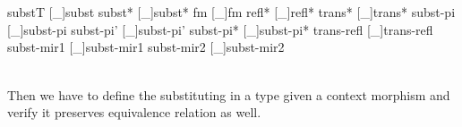 {\begin{code}
\\
\>[2]\<[14]%
\>[14]\AgdaSymbol{\{} \AgdaSymbol{:} \AgdaFunction{[}  \AgdaFunction{]}   \AgdaSymbol{\}\{} \AgdaSymbol{:} \AgdaFunction{[}  \AgdaFunction{]}   \AgdaSymbol{\}}\<%
\\
\>[2]\<[14]%
\>[14]\AgdaSymbol{\{} \AgdaSymbol{:}    \AgdaSymbol{\}\{} \AgdaSymbol{:}    \AgdaSymbol{\}}  \<[45]%
\>[45]\<%
\\
\>[2]\<[14]%
\>[14]\AgdaFunction{[}   \AgdaFunction{]}       \AgdaFunction{[}   \AgdaFunction{]}     \<%
\\
\>[0]\<[2]%
\>[2]  \AgdaSymbol{=} \AgdaFunction{[}  \AgdaSymbol{\_} \AgdaFunction{]sym} \AgdaSymbol{(} \AgdaSymbol{(}\AgdaFunction{[}  \AgdaSymbol{\_} \AgdaFunction{]sym} \AgdaSymbol{))}\<%
\\
%
\\
\>   \<[15]%
\>[15]\<%
\\
\>[0]\<[2]%
\>[2] \AgdaSymbol{(}substT  [\_]subst\AgdaSymbol{;} subst*  [\_]subst*\AgdaSymbol{;} fm  [\_]fm \AgdaSymbol{;}
            refl*  [\_]refl* \AgdaSymbol{;} trans*  [\_]trans*\AgdaSymbol{;} subst-pi  [\_]subst-pi \AgdaSymbol{;}
            subst-pi'  [\_]subst-pi' \AgdaSymbol{;} subst-pi*  [\_]subst-pi* \AgdaSymbol{;}
            trans-refl  [\_]trans-refl \AgdaSymbol{;} subst-mir1  [\_]subst-mir1 \AgdaSymbol{;}
            subst-mir2  [\_]subst-mir2\AgdaSymbol{)}\<%
\\
%
\\
\>\<\end{code}
}

Then we have to define the substituting in a type given a context morphism and verify it preserves equivalence relation as well.

